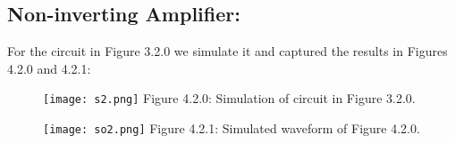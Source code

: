 \subsection{Non-inverting Amplifier:}

For the circuit in Figure 3.2.0 we simulate it and captured the results in Figures 4.2.0 and 4.2.1:

\begin{figure}[H]
\texttt{[image: s2.png]}
\centering \linebreak \linebreak Figure 4.2.0: Simulation of circuit in Figure 3.2.0.
\end{figure} \hfill

\begin{figure}[H]
\texttt{[image: so2.png]}
\centering \linebreak \linebreak Figure 4.2.1: Simulated waveform of Figure 4.2.0.
\end{figure} \hfill

\pagebreak